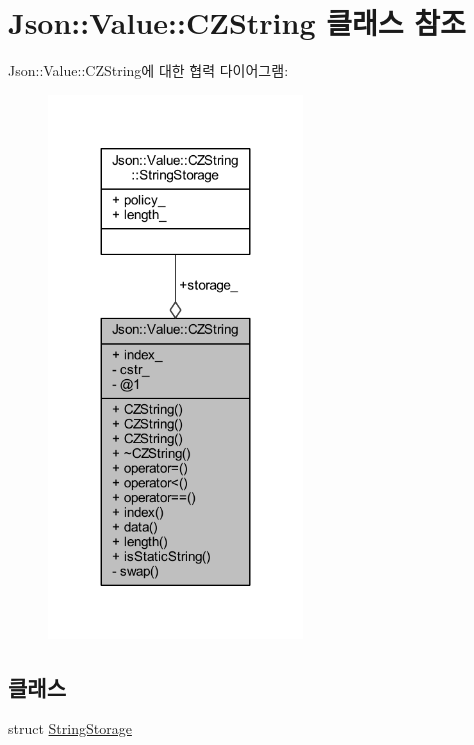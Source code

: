 \hypertarget{class_json_1_1_value_1_1_c_z_string}{}\section{Json\+:\+:Value\+:\+:C\+Z\+String 클래스 참조}
\label{class_json_1_1_value_1_1_c_z_string}


Json\+:\+:Value\+:\+:C\+Z\+String에 대한 협력 다이어그램\+:\nopagebreak
\begin{figure}[H]
\begin{center}
\leavevmode
\includegraphics[width=191pt]{class_json_1_1_value_1_1_c_z_string__coll__graph}
\end{center}
\end{figure}
\subsection*{클래스}
\begin{DoxyCompactItemize}
\item 
struct \hyperlink{struct_json_1_1_value_1_1_c_z_string_1_1_string_storage}{String\+Storage}
\end{DoxyCompactItemize}
